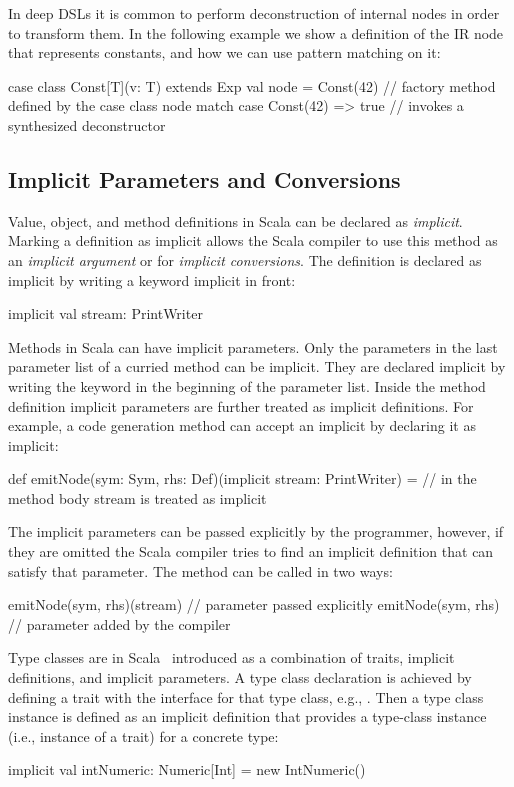 In deep DSLs it is common to perform deconstruction of internal nodes in order to transform them. In the following example
we show a definition of the IR node that represents constants, and how we can use pattern matching on it:\begin{lstparagraph}
case class Const[T](v: T) extends Exp
val node = Const(42) // factory method defined by the case class
node match {
  case Const(42) => true  // invokes a synthesized deconstructor
}
\end{lstparagraph}

\subsection{Implicit Parameters and Conversions}

Value, object, and method definitions in Scala can be declared as \emph{implicit}. Marking a
definition as implicit allows the Scala compiler to use this method as an \emph{implicit argument} or
for \emph{implicit conversions}. The definition is declared as implicit by writing a keyword implicit in
front:\begin{lstparagraph}
implicit val stream: PrintWriter
\end{lstparagraph}

Methods in Scala can have implicit parameters. Only the parameters in the last parameter list of a curried method
can be implicit. They are declared implicit by writing the keyword  in the beginning
of the parameter list. Inside the method definition implicit parameters are further treated as implicit
definitions. For example, a code generation method can accept an implicit  by declaring it as implicit:\begin{lstparagraph}
def emitNode(sym: Sym, rhs: Def)(implicit stream: PrintWriter) = {
// in the method body stream is treated as implicit
}
\end{lstparagraph}

The implicit parameters can be passed explicitly by the programmer, however,
 if they are omitted the Scala compiler tries to find an implicit definition
 that can satisfy that parameter. The  method can be called in two ways:\begin{lstparagraph}
emitNode(sym, rhs)(stream) // parameter passed explicitly
emitNode(sym, rhs)         // parameter added by the compiler
 \end{lstparagraph}

 Type classes are in Scala~\cite{oliveira_type_2010} introduced
 as a combination of traits, implicit definitions, and implicit parameters. A type class declaration
 is achieved by defining a trait with the interface for that type class, e.g., . Then a type class
 instance is defined as an implicit definition that provides a type-class instance (i.e., instance of
 a trait) for a concrete type:\begin{lstparagraph}
implicit val intNumeric: Numeric[Int] = new IntNumeric()
 \end{lstparagraph}

